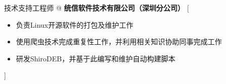 \documentclass[zh]{resume}
\begin{document}
\begin{experiences}
    {技术支持工程师 @ \textbf{统信软件技术有限公司（深圳分公司）}}%
    [\begin{itemize}
		\item 负责Linux开源软件的打包及维护工作
		\item 使用爬虫技术完成重复性工作，并利用相关知识协助同事完成工作
		\item 研发ShiroDEB，并基于此编写和维护自动构建脚本
    \end{itemize}]
\end{experiences}

\end{document}
